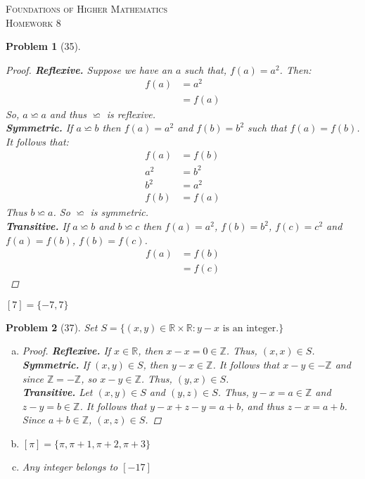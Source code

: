 \documentclass{article}
\theoremstyle{problem}
\newtheorem{prob}{Problem}
\theoremstyle{plain}
\theoremstyle{remark}
\begin{document}
\begin{center}
\textsc{\Large Foundations of Higher Mathematics}\\[.3cm]
\textsc{\Large Homework 8}
\end{center}

\begin{prob}[35]\ \\[-1cm]
  \begin{proof}
    \textbf{Reflexive.} Suppose we have an $a$ such that, $f(a) = a^2$. Then: 
    \begin{align*}
      f(a) &= a^2\\
      &= f(a)
    \end{align*}
    So, $a \backsimeq a$ and thus $\backsimeq$ is reflexive.\\
    \textbf{Symmetric.} If $a \backsimeq b$ then $f(a) = a^2$ and $f(b) = b^2$ such that $f(a) = f(b)$. It follows that:    
    \begin{align*}
      f(a) &= f(b)\\
      a^2 &= b^2\\
      b^2 &= a^2\\
      f(b) &= f(a)
    \end{align*}
    Thus $b \backsimeq a$. So $\backsimeq$ is symmetric.\\
    \textbf{Transitive.} If $a \backsimeq b$ and $b \backsimeq c$ then $f(a) = a^2$, $f(b) = b^2$, $f(c) = c^2$ and $f(a) = f(b)$, $f(b) = f(c)$.
    \begin{align*}
      f(a) &= f(b)\\
      &= f(c)
    \end{align*}
  \end{proof}
  $[7] = \{-7,7\}$
\end{prob}

\begin{prob}[37]
  Set $S = \{(x,y) \in \mathbb{R} \times \mathbb{R} : y - x \text{ is an integer.}\}$
  \begin{enumerate}[a)]
  \item \begin{proof}
      \textbf{Reflexive.} If $x \in \mathbb{R}$, then $x - x = 0 \in \mathbb{Z}$. Thus, $(x,x) \in S$.\\
      \textbf{Symmetric.} If $(x,y) \in S$, then $y - x \in \mathbb{Z}$. It follows that $x - y \in -\mathbb{Z}$ and since $\mathbb{Z} = -\mathbb{Z}$, so $x -y \in \mathbb{Z}$. Thus, $(y,x) \in S$.\\
      \textbf{Transitive.} Let $(x,y) \in S$ and $(y,z) \in S$. Thus, $y-x = a \in \mathbb{Z}$ and $z - y = b \in \mathbb{Z}$. It follows that $y - x + z - y = a + b$, and thus $z - x = a + b$. Since $a + b \in \mathbb{Z}$, $(x,z) \in S$.
    \end{proof}
  \item $[\pi] = \{\pi,\pi+1,\pi+2,\pi+3\}$
  \item Any integer belongs to $[-17]$
  \end{enumerate}
\end{prob}
%
\end{document}
